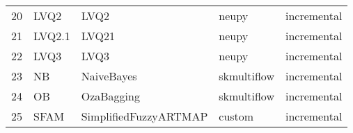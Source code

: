 \begin{table}[H]
\begin{tabular}{lllll}
20 &    LVQ2 &                           LVQ2 &        neupy &  incremental \\
21 &  LVQ2.1 &                          LVQ21 &        neupy &  incremental \\
22 &    LVQ3 &                           LVQ3 &        neupy &  incremental \\
23 &      NB &                     NaiveBayes &  skmultiflow &  incremental \\
24 &      OB &                     OzaBagging &  skmultiflow &  incremental \\
25 &    SFAM &          SimplifiedFuzzyARTMAP &       custom &  incremental \\
\hline
\end{tabular}
\end{table}
